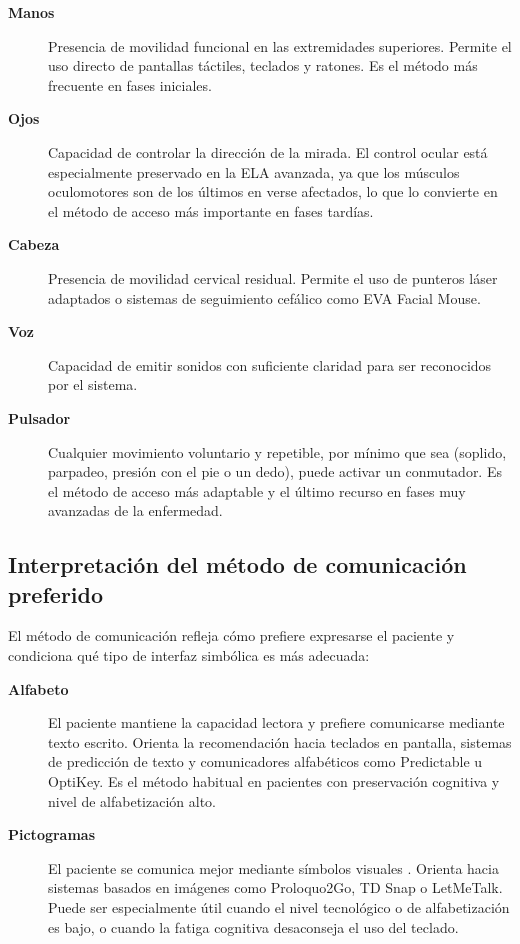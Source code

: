 \begin{description}
	\item[\textbf{Manos}] Presencia de movilidad funcional en las extremidades superiores. Permite el uso directo de pantallas táctiles, teclados y ratones. Es el método más frecuente en fases iniciales.
	\item[\textbf{Ojos}] Capacidad de controlar la dirección de la mirada. El control ocular está especialmente preservado en la ELA avanzada, ya que los músculos oculomotores son de los últimos en verse afectados, lo que lo convierte en el método de acceso más importante en fases 		tardías.
	\item[\textbf{Cabeza}] Presencia de movilidad cervical residual. Permite el uso de punteros láser adaptados o sistemas de seguimiento cefálico como EVA Facial Mouse.
	\item[\textbf{Voz}] Capacidad de emitir sonidos con suficiente claridad para ser reconocidos por el sistema.
	\item[\textbf{Pulsador}] Cualquier movimiento voluntario y repetible, por mínimo que sea (soplido, parpadeo, presión con el pie o un dedo), puede activar un conmutador. Es el método de acceso más adaptable y el último recurso en fases muy avanzadas de la enfermedad.
\end{description}

\subsection{Interpretación del método de comunicación preferido}
El método de comunicación refleja cómo prefiere expresarse el paciente y condiciona qué tipo de interfaz simbólica es más adecuada:

\begin{description}
	\item[\textbf{Alfabeto}] El paciente mantiene la capacidad lectora y prefiere comunicarse mediante texto escrito. Orienta la recomendación hacia teclados en pantalla, sistemas de predicción de texto y comunicadores alfabéticos como Predictable u OptiKey. Es el método habitual 			en pacientes con preservación cognitiva y nivel de alfabetización alto.
	\item[\textbf{Pictogramas}] El paciente se comunica mejor mediante símbolos visuales \cite{arasaac:web}. Orienta hacia sistemas basados en imágenes como Proloquo2Go, TD Snap o LetMeTalk. Puede ser especialmente útil cuando el nivel tecnológico o de alfabetización es bajo, o cuando la fatiga 		cognitiva desaconseja el uso del teclado.
\end{description}

